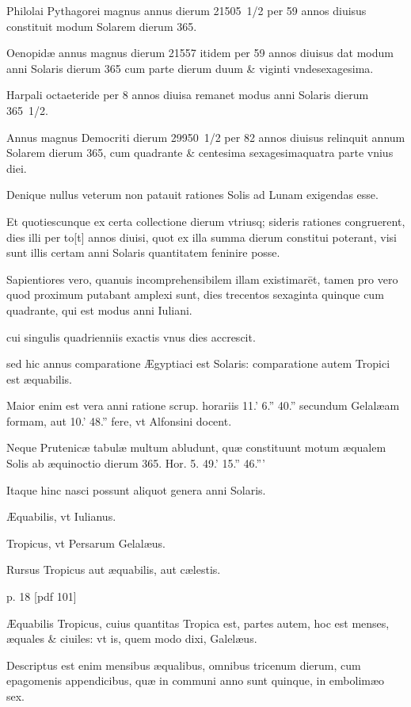 Philolai Pythagorei magnus
annus dierum 21505 1/2 per 59 annos diuisus constituit modum
Solarem dierum 365.

Oenopidæ annus magnus dierum 21557
itidem per 59 annos diuisus dat modum anni Solaris dierum 365 cum
parte dierum duum \& viginti vndesexagesima.

Harpali octaeteride per
8 annos diuisa remanet modus anni Solaris dierum 365 1/2.

Annus magnus
Democriti dierum 29950 1/2 per 82 annos diuisus relinquit annum
Solarem dierum 365, cum quadrante \& centesima sexagesimaquatra
parte vnius diei.

Denique nullus veterum non patauit rationes
Solis ad Lunam exigendas esse.

Et quotiescunque ex certa collectione
dierum vtriusq; sideris rationes congruerent, dies illi per to[t]
annos diuisi, quot ex illa summa dierum constitui poterant, visi sunt
illis certam anni Solaris quantitatem feninire posse.

Sapientiores vero,
quanuis incomprehensibilem illam existimarēt, tamen pro vero quod
proximum putabant amplexi sunt, dies trecentos sexaginta quinque
cum quadrante, qui est modus anni Iuliani.

cui singulis quadrienniis
exactis vnus dies accrescit.

sed hic annus comparatione Ægyptiaci
est Solaris: comparatione autem Tropici est æquabilis.

Maior
enim est vera anni ratione scrup. horariis 11.' 6.'' 40.'' secundum
Gelalæam formam, aut 10.' 48.'' fere, vt Alfonsini docent.

Neque
Prutenicæ tabulæ multum abludunt, quæ constituunt motum
æqualem Solis ab æquinoctio dierum 365. Hor. 5. 49.' 15.'' 46.'''

Itaque hinc nasci possunt aliquot genera anni Solaris.

Æquabilis,
vt Iulianus.

Tropicus, vt Persarum Gelalæus.

Rursus Tropicus
aut æquabilis, aut cælestis.



p. 18 [pdf 101]


Æquabilis
Tropicus, cuius quantitas
Tropica est, partes autem, hoc est menses, æquales \& ciuiles: vt is,
quem modo dixi, Galelæus.

Descriptus est enim mensibus æqualibus,
omnibus tricenum dierum, cum epagomenis appendicibus, quæ
in communi anno sunt quinque, in embolimæo sex.

